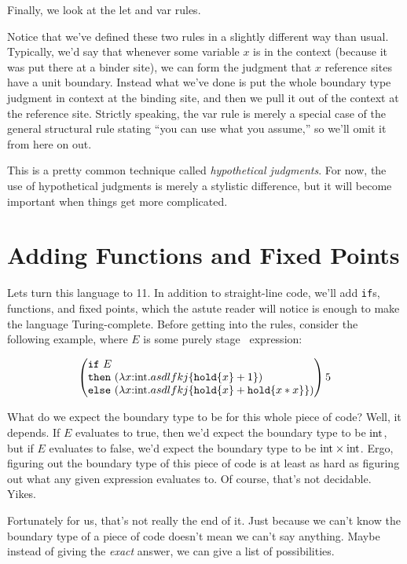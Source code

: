 \documentclass[]{article}
\newcommand {\next}{asdlfkj}
\begin{document}
Finally, we look at the let and var rules.

Notice that we've defined these two rules in a slightly different way than usual.
Typically, we'd say that whenever some variable $x$ is in the context 
(because it was put there at a binder site),
we can form the judgment that $x$ reference sites have a unit boundary.
Instead what we've done is put the whole boundary type judgment in context at the binding site,
and then we pull it out of the context at the reference site.
Strictly speaking, the var rule is merely a special case of the 
general structural rule stating ``you can use what you assume,'' so we'll omit it from here on out.

This is a pretty common technique  called {\em hypothetical judgments}.
For now, the use of hypothetical judgments is merely a stylistic difference,
but it will become important when things get more complicated.

\section{Adding Functions and Fixed Points}

Lets turn this language to 11.  
In addition to straight-line code, we'll add \texttt{if}s, functions, and fixed points,
which the astute reader will notice is enough to make the language Turing-complete.
Before getting into the rules, consider the following example, 
where $E$ is some purely stage \bbone\ expression:

\[
\left(
\tallif {E}
	{(\lam x \rmint {\next\{\pause\{x\}+1\})}}
	{(\lam x \rmint {\next\{\pause\{x\}+\pause\{x*x\}\}})}
\right ) 5
\]

What do we expect the boundary type to be for this whole piece of code?
Well, it depends. 
If $E$ evaluates to true, then we'd expect the boundary type to be ${\rm int}$,
but if $E$ evaluates to false, we'd expect the boundary type to be ${\rm int} \times {\rm int}$.
Ergo, figuring out the boundary type of this piece of code is at least as hard 
as figuring out what any given expression evaluates to.
Of course, that's not decidable. Yikes. 

Fortunately for us, that's not really the end of it.  
Just because we can't know the boundary type of a piece of code doesn't mean we can't say anything.  
Maybe instead of giving the {\em exact} answer, we can give a list of possibilities.
\end{document}
